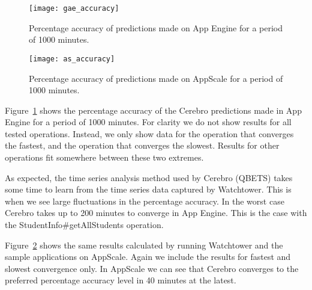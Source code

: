 \begin{figure}
\centering
\texttt{[image: gae\_accuracy]}
\caption{Percentage accuracy of predictions made on App Engine for a period of 1000 minutes.}
\label{fig:gae_accuracy}
\end{figure}

\begin{figure}
\centering
\texttt{[image: as\_accuracy]}
\caption{Percentage accuracy of predictions made on AppScale for a period of 1000 minutes.}
\label{fig:as_accuracy}
\end{figure}

Figure~\ref{fig:gae_accuracy} shows the percentage accuracy of the Cerebro predictions made in App Engine 
for a period of 1000 minutes. For clarity we do not show results for all tested operations. Instead,
we only show data for the operation that converges the fastest, and the operation that converges the slowest.
Results for other operations fit somewhere between these two extremes.

As expected, the time series analysis method used by Cerebro (QBETS) takes some time to learn
from the time series data captured by Watchtower. This is when we see large fluctuations in the percentage accuracy. 
In the worst case Cerebro takes up to 200 minutes to converge in App Engine. This is the case with the
StudentInfo\#getAllStudents operation. 

Figure~\ref{fig:as_accuracy} shows the same results calculated by running Watchtower and the sample applications on AppScale.
Again we include the results for fastest and slowest convergence only. 
In AppScale
we can see that Cerebro converges to the preferred percentage accuracy level in 40 minutes at the latest.

